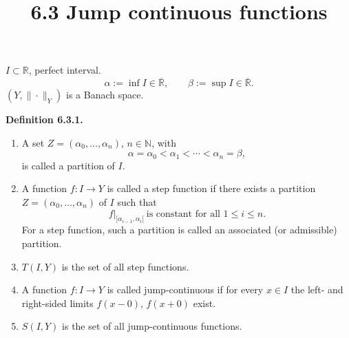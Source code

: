 \documentclass[12pt]{article}
\title{6.3 Jump continuous functions}
\date{}
\newenvironment{definition}[1]{%
  \par\vspace{6pt}\noindent\textbf{Definition #1.}\itshape\space
}{%
  \par\vspace{6pt}
}
\begin{document}
\maketitle


$I\subset\mathbb R$, perfect interval.
\[
\alpha:=\inf I\in\overline{\mathbb R},
\qquad
\beta:=\sup I\in\overline{\mathbb R}.
\]
$(Y,\|\cdot\|_Y)$ is a Banach space.

\begin{definition}{6.3.1}
\begin{enumerate}
    \item A set $Z=(\alpha_0,\ldots,\alpha_n)$, $n\in\mathbb N$, with
    \[
    \alpha=\alpha_0<\alpha_1<\cdots<\alpha_n=\beta,
    \]
    is called a partition of $I$.

    \item A function $f:I\to Y$ is called a step function if there exists a partition
    $Z=(\alpha_0,\ldots,\alpha_n)$ of $I$ such that
    \[
    f|_{]\alpha_{i-1},\alpha_i[}\ \text{is constant for all }1\le i\le n.
    \]
    For a step function, such a partition is called an associated (or admissible) partition.

    \item $T(I,Y)$ is the set of all step functions.

    \item A function $f:I\to Y$ is called jump-continuous if for every $x\in I$ the left- and right-sided limits
    $f(x-0)$, $f(x+0)$ exist.

    \item $S(I,Y)$ is the set of all jump-continuous functions.
\end{enumerate}
\end{definition}
\end{document}

